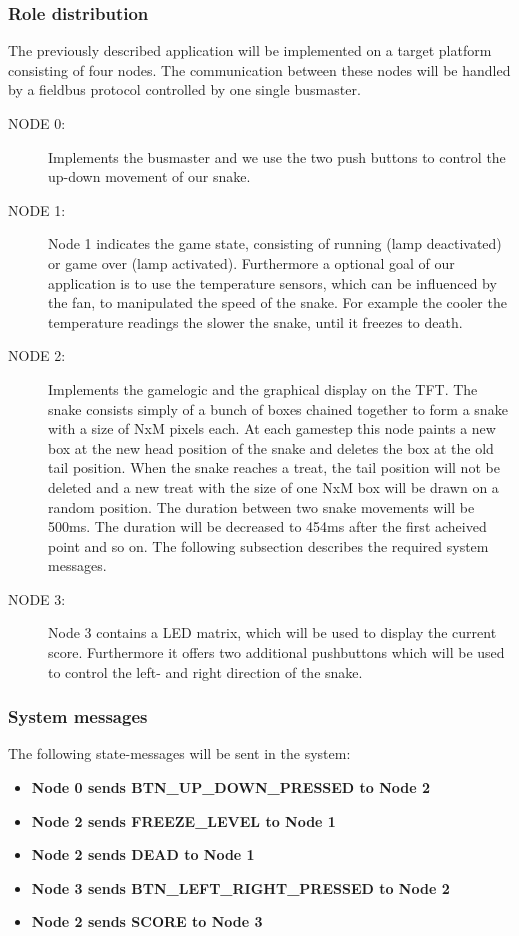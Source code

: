 \subsubsection{Role distribution}
The previously described application will be implemented on a target platform
consisting of four nodes. The communication between these nodes will be handled
by a fieldbus protocol controlled by one single busmaster.
\begin{description}
\item[NODE 0:]
Implements the busmaster and we use the two push buttons to control the up-down
movement of our snake.
\item[NODE 1:]
Node 1 indicates the game state, consisting of running (lamp deactivated) or game over
(lamp activated). Furthermore a optional goal of our application is to use the 
temperature sensors, which can be influenced by the fan, to manipulated the speed
of the snake. For example the cooler the temperature readings the slower the snake, until
it freezes to death. 
\item[NODE 2:]
Implements the gamelogic and the graphical display on the TFT. The snake consists 
simply of a bunch of boxes chained together to form a snake with a size of NxM 
pixels each. At each gamestep this node paints a new box at the new head position
of the snake and deletes the box at the old tail position. When the snake reaches
a treat, the tail position will not be deleted and a new treat with the size of 
one NxM box will be drawn on a random position. The duration between two snake 
movements will be 500ms. The duration will be decreased to 454ms after the first
acheived point and so on. The following subsection describes the required system
messages.
\item[NODE 3:]
Node 3 contains a LED matrix, which will be used to display the current score. 
Furthermore it offers two additional pushbuttons which will be used to control
the left- and right direction of the snake.
\end{description}

 

\subsubsection{System messages}

The following state-messages will be sent in the system:

\begin{itemize}
  \item \textbf{Node 0 sends BTN\_UP\_DOWN\_PRESSED to Node 2}
  \item \textbf{Node 2 sends FREEZE\_LEVEL to Node 1}
  \item \textbf{Node 2 sends DEAD to Node 1}
  \item \textbf{Node 3 sends BTN\_LEFT\_RIGHT\_PRESSED to Node 2}
  \item \textbf{Node 2 sends SCORE to Node 3}
\end{itemize}

